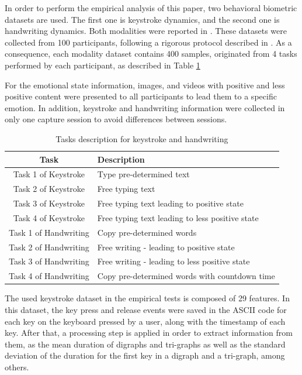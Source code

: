 \documentclass[conference]{IEEEtran}
\begin{document}
In order to perform the empirical analysis of this paper, two behavioral biometric datasets are used.  The first one is keystroke dynamics, and the second one is handwriting dynamics. Both modalities were reported in \cite{cheng-thesis, cheng-hw-gender, cheng-emotional}. These datasets were collected from 100 participants, following a rigorous protocol described in \cite{cheng-thesis}. As a consequence, each modality dataset contains 400 samples, originated from 4 tasks performed by each participant, as described in Table \ref{tab:tasks}

For the emotional state information, images, and videos with positive and less positive content were presented to all participants to lead them to a specific emotion. In addition, keystroke and handwriting information were collected in only one capture session to avoid differences between sessions.

\begin{table}[htbp]
    \centering
    \caption{Tasks description for keystroke and handwriting}
    \label{tab:tasks}
    \setlength{\tabcolsep}{3.5pt}
    \begin{tabular}{|c|l|}
        \hline
         \textbf{Task} & \textbf{Description} \\ \hline
         Task 1 of Keystroke & Type pre-determined text \\ \hline
         Task 2 of Keystroke & Free typing text \\ \hline
         Task 3 of Keystroke & Free typing text leading to positive state \\ \hline
         Task 4 of Keystroke & Free typing text leading to less positive state \\ \hline
         Task 1 of Handwriting & Copy pre-determined words \\ \hline
         Task 2 of Handwriting & Free writing - leading to positive state \\ \hline
         Task 3 of Handwriting & Free writing - leading to less positive state \\ \hline
         Task 4 of Handwriting & Copy pre-determined words with countdown time \\ \hline
    \end{tabular}
\end{table}


The used keystroke dataset in the empirical tests is composed of 29 features. In this dataset, the key press and release events were saved in the ASCII code for each key on the keyboard pressed by a user, along with the timestamp of each key. After that, a processing step is applied in order to extract information from them, as the mean duration of digraphs and tri-graphs as well as the standard deviation of the duration for the first key in a digraph and a tri-graph, among others.
\end{document}
